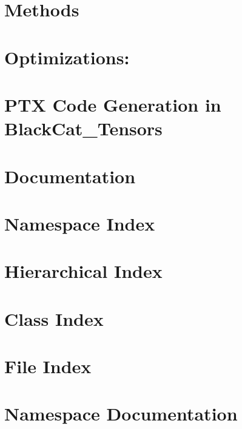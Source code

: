 \documentclass[twoside]{book}
\newcommand{\+}{\discretionary{\mbox{\scriptsize$\hookleftarrow$}}{}{}}
\begin{document}
\chapter{Methods}
\label{md_docs_methods}
\hypertarget{md_docs_methods}{}

\chapter{Optimizations\+:}
\label{md_docs_optimizations}
\hypertarget{md_docs_optimizations}{}

\chapter{P\+TX Code Generation in Black\+Cat\+\_\+\+Tensors}
\label{md_docs_PTX_Generation}
\hypertarget{md_docs_PTX_Generation}{}

\chapter{Documentation}
\label{md_README}
\hypertarget{md_README}{}

\chapter{Namespace Index}

\chapter{Hierarchical Index}

\chapter{Class Index}

\chapter{File Index}

\chapter{Namespace Documentation}

































\end{document}
